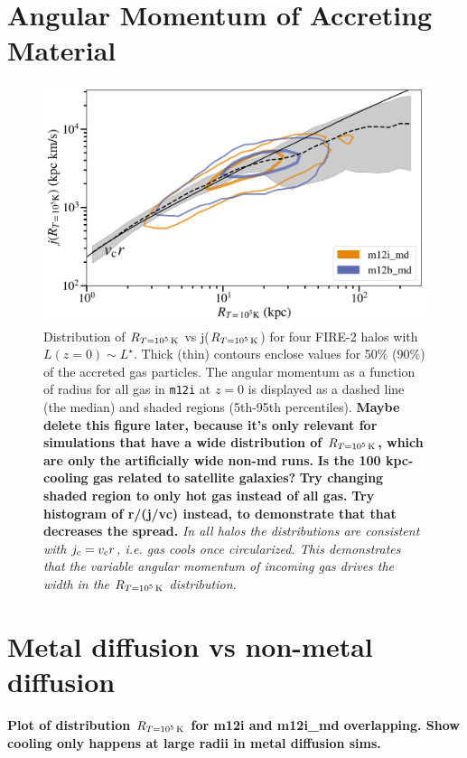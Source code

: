 \documentclass[fleqn,usenatbib]{mnras}
\newcommand{\Rcool}{R_{T=10^5\,{\rm K}}}
\begin{document}

\appendix

\section{Angular Momentum of Accreting Material}

\begin{figure}
    \centering
    \includegraphics[width=\columnwidth]{figures/j_vs_rcondense.png}
    \caption{
    Distribution of $\Rcool$ vs j($\Rcool$) for four FIRE-2 halos with $L(z=0) \sim L^\star$.
Thick (thin) contours enclose values for 50\% (90\%) of the accreted gas particles.
The angular momentum as a function of radius for all gas in \texttt{m12i} at $z=0$ is displayed as a dashed line (the median) and shaded regions (5th-95th percentiles).
\textbf{
Maybe delete this figure later, because it's only relevant for simulations that have a wide distribution of $\Rcool$, which are only the artificially wide non-md runs.
}
\textbf{Is the 100 kpc-cooling gas related to satellite galaxies?}
\textbf{Try changing shaded region to only hot gas instead of all gas.}
\textbf{Try histogram of r/(j/vc) instead, to demonstrate that that decreases the spread.}
\textit{
In all halos the distributions are consistent with $j_{\rm c} = v_{\rm c} r$, i.e. gas cools once circularized.
This demonstrates that the variable angular momentum of incoming gas drives the width in the $\Rcool$ distribution.
}
    }
    \label{f: jcool vs Rcool}
\end{figure}

\section{Metal diffusion vs non-metal diffusion}

\textbf{Plot of distribution $\Rcool$ for m12i and m12i\_md overlapping. Show cooling only happens at large radii in metal diffusion sims.}



\bsp	%
\label{lastpage}
\end{document}
